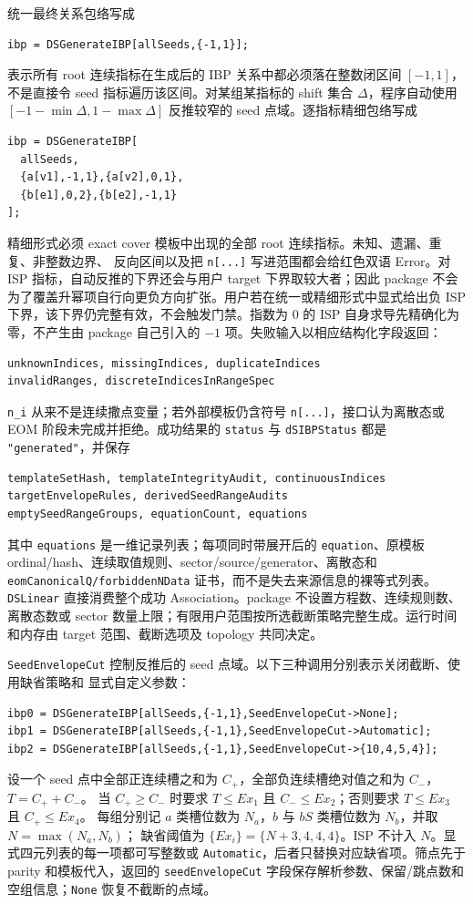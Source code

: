﻿\documentclass[a4paper,11pt]{article}
\begin{document}
统一最终关系包络写成
\begin{verbatim}
ibp = DSGenerateIBP[allSeeds,{-1,1}];
\end{verbatim}
表示所有 root 连续指标在生成后的 IBP 关系中都必须落在整数闭区间 $[-1,1]$，不是直接令
seed 指标遍历该区间。对某组某指标的 shift 集合 $\Delta$，程序自动使用
$[-1-\min\Delta,1-\max\Delta]$ 反推较窄的 seed 点域。逐指标精细包络写成
\begin{verbatim}
ibp = DSGenerateIBP[
  allSeeds,
  {a[v1],-1,1},{a[v2],0,1},
  {b[e1],0,2},{b[e2],-1,1}
];
\end{verbatim}
精细形式必须 exact cover 模板中出现的全部 root 连续指标。未知、遗漏、重复、非整数边界、
反向区间以及把 \texttt{n[...]} 写进范围都会给红色双语 Error。对 ISP 指标，自动反推的下界还会与用户 target 下界取较大者；因此 package 不会为了覆盖升幂项自行向更负方向扩张。用户若在统一或精细形式中显式给出负 ISP 下界，该下界仍完整有效，不会触发门禁。指数为 $0$ 的 ISP 自身求导先精确化为零，不产生由 package 自己引入的 $-1$ 项。失败输入以相应结构化字段返回：
\begin{verbatim}
unknownIndices, missingIndices, duplicateIndices
invalidRanges, discreteIndicesInRangeSpec
\end{verbatim}

\texttt{n\_i} 从来不是连续撒点变量；若外部模板仍含符号 \texttt{n[...]}，接口认为离散态或
EOM 阶段未完成并拒绝。成功结果的 \texttt{status} 与 \texttt{dSIBPStatus} 都是
\texttt{"generated"}，并保存
\begin{verbatim}
templateSetHash, templateIntegrityAudit, continuousIndices
targetEnvelopeRules, derivedSeedRangeAudits
emptySeedRangeGroups, equationCount, equations
\end{verbatim}
其中 \texttt{equations} 是一维记录列表；每项同时带展开后的 \texttt{equation}、原模板
ordinal/hash、连续取值规则、sector/source/generator、离散态和
\texttt{eomCanonicalQ/forbiddenNData} 证书，而不是失去来源信息的裸等式列表。
\texttt{DSLinear} 直接消费整个成功 Association。package 不设置方程数、连续规则数、离散态数或
sector 数量上限；有限用户范围按所选截断策略完整生成。运行时间和内存由 target 范围、截断选项及
topology 共同决定。

\texttt{SeedEnvelopeCut} 控制反推后的 seed 点域。以下三种调用分别表示关闭截断、使用缺省策略和
显式自定义参数：
\begin{verbatim}
ibp0 = DSGenerateIBP[allSeeds,{-1,1},SeedEnvelopeCut->None];
ibp1 = DSGenerateIBP[allSeeds,{-1,1},SeedEnvelopeCut->Automatic];
ibp2 = DSGenerateIBP[allSeeds,{-1,1},SeedEnvelopeCut->{10,4,5,4}];
\end{verbatim}
设一个 seed 点中全部正连续槽之和为 $C_+$，全部负连续槽绝对值之和为 $C_-$，$T=C_++C_-$。
当 $C_+\geq C_-$ 时要求 $T\leq Ex_1$ 且 $C_-\leq Ex_2$；否则要求 $T\leq Ex_3$ 且 $C_+\leq Ex_4$。
每组分别记 $a$ 类槽位数为 $N_a$，$b$ 与 $bS$ 类槽位数为 $N_b$，并取 $N=\max(N_a,N_b)$；
缺省阈值为 $\{Ex_i\}=\{N+3,4,4,4\}$。ISP 不计入 $N$。显式四元列表的每一项都可写整数或
\texttt{Automatic}，后者只替换对应缺省项。筛点先于 parity 和模板代入，返回的
\texttt{seedEnvelopeCut} 字段保存解析参数、保留/跳点数和空组信息；\texttt{None} 恢复不截断的点域。
\end{document}
